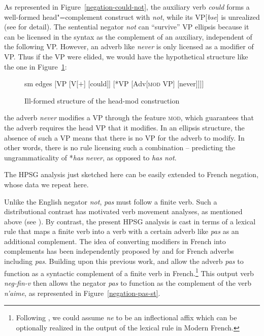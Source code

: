 \documentclass[output=paper
	        ,collection
	        ,collectionchapter
 	        ,biblatex
                ,babelshorthands
                ,newtxmath
                ,draftmode
                ,colorlinks, citecolor=brown
]{langscibook}
\begin{document}
{\begin{exe}
\begin{xlist}
\begin{exe}
\begin{xlist}
As represented in Figure~\ref{negation-could-not}, the auxiliary verb \textit{could} forms a well-formed head"=complement construct with \textit{not}, while its
VP[\textit{bse}] is unrealized (see \citealt{Kim:00, KS:08} for
detail). The sentential negator \textit{not} can ``survive'' VP ellipsis because it can be
licensed in the syntax as the complement of an auxiliary, independent
of the following VP.  However, an adverb like \textit{never} is only
licensed as a modifier of VP. Thus if the VP were elided, we would have the hypothetical
structure like the one in Figure~\ref{negation-fig-could-never}:
\begin{figure}
	\begin{forest}
		sm edges
		[VP
			[V{[\aux $+$]}
				[could]]
			[*VP
				[Adv{[\textsc{mod} VP]}
					[never]]]]
	\end{forest}
\caption{Ill-formed structure of the head-mod construction}\label{negation-fig-could-never}
\end{figure}
the adverb \textit{never} modifies a VP through the feature \textsc{mod},
which guarantees that the adverb requires the head VP that it
modifies. In an ellipsis structure, the absence of such a VP means
that there is no VP for the adverb to modify.  In other words, there
is no rule licensing such a combination -- predicting the
ungrammaticality of *\textit{has never},  as opposed to \textit{has not}.


The HPSG analysis just sketched here can be easily extended to French negation, whose
data we repeat here.

\eal
{}
\zl

\noindent
Unlike the English negator \textit{not}, \textit{pas} must follow a
finite verb. Such a distributional contrast has motivated verb
movement analyses, as mentioned above (see \citealt{Pollock:89,Zanuttini:2001}).
By contrast, the present HPSG analysis is cast
in terms of a lexical rule that maps a finite verb into a verb
with a certain adverb like \textit{pas} as an additional complement.
 The idea of converting modifiers in French into
complements has been independently proposed by \citet{Miller92d-u} and
\citet{AG:94} for French adverbs including
\textit{pas}.  Building upon this
previous work, \citet{AG:97} and \citet{Kim:00}
allow the adverb \textit{pas} to function
as a syntactic complement of a finite verb in French.\footnote{Following \citet{AG:94}, we could assume \textit{ne} to
be an inflectional affix which can be optionally realized
in the output of the lexical rule in Modern French.}
This output verb \textit{neg-fin-v} then allows the negator \textit{pas} to function
as the complement of the verb \textit{n'aime}, as represented in Figure~\ref{negation-pas-st}.


\end{xlist}
\end{exe}
\end{xlist}
\end{exe}}
\end{document}
